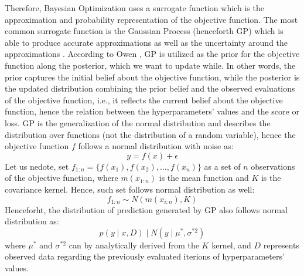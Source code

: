 Therefore, Bayesian Optimization uses a surrogate function which is the approximation and probability representation of the objective function. The most common surrogate function is the Gaussian Process (henceforth GP) which is able to produce accurate approximations as well as the uncertainty around the approximations \citep{wang2020bayesian}.
According to Owen \citep{owen2022hyperparameter}, GP is utilized as the prior for the objective function along the posterior, which we want to update while.
In other words, the prior captures the initial belief about the objective function, while the posterior is the updated distribution combining the prior belief and the observed evaluations of the objective function, i.e., it reflects the current belief about the objective function, hence the relation between the hyperparameters' values and the score or loss.
GP is the generalization of the normal distribution and describes the distribution over functions (not the distribution of a random variable), hence the objective function $f$ follows a normal distribution with noise as:
\begin{equation}\label{eq}
    y = f\left(x\right) + \epsilon
\end{equation}
Let us nedote, set $f_{1:n} = \{ f\left(x_1\right), f\left(x_2\right), \ldots, f\left(x_n\right)\}$ as a set of $n$ observations of the objective function, where $m\left(x_{1:n}\right)$ is the mean function and $K$ is the covariance kernel. Hence, such set follows normal distribution as well:
\begin{equation}\label{eq}
    f_{1:n} \sim N\left(m\left(x_{i:n}\right), K\right)
\end{equation}
Henceforht, the distribution of prediction generated by GP also follows normal distribution as:
\begin{equation}\label{eq}
    p\left(y \mid x, D\right) \mid N\left(y \mid \mu^{*}, \sigma^{*2}\right)
\end{equation}
where $\mu^{*}$ and $\sigma^{*2}$ can by analytically derived from the $K$ kernel, and $D$ represents observed data regarding the previously evaluated iterions of hyperparameters' values.

